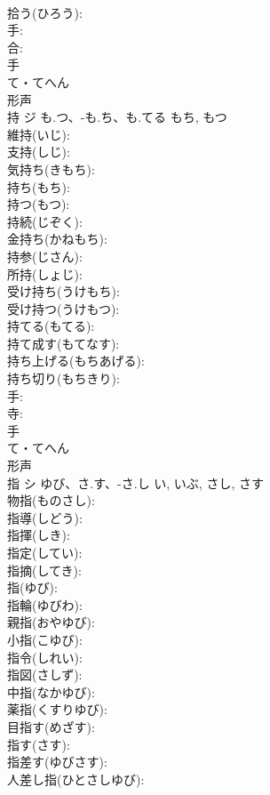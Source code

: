 \documentclass[8pt]{extreport}
\begin{document}
\begin{CJK}{UTF8}{min}
\\	拾う(ひろう): 
\\	手: 
\\	合: 
\\	手	
\\	て・てへん	
\\	形声 
\\	持	ジ	も.つ、-も.ち、も.てる	もち, もつ	
\\	維持(いじ): 
\\	支持(しじ): 
\\	気持ち(きもち): 
\\	持ち(もち): 
\\	持つ(もつ): 
\\	持続(じぞく): 
\\	金持ち(かねもち): 
\\	持参(じさん): 
\\	所持(しょじ): 
\\	受け持ち(うけもち): 
\\	受け持つ(うけもつ): 
\\	持てる(もてる): 
\\	持て成す(もてなす): 
\\	持ち上げる(もちあげる): 
\\	持ち切り(もちきり): 
\\	手: 
\\	寺: 
\\	手	
\\	て・てへん	
\\	形声 
\\	指	シ	ゆび、さ.す、-さ.し	い, いぶ, さし, さす	
\\	物指(ものさし): 
\\	指導(しどう): 
\\	指揮(しき): 
\\	指定(してい): 
\\	指摘(してき): 
\\	指(ゆび): 
\\	指輪(ゆびわ): 
\\	親指(おやゆび): 
\\	小指(こゆび): 
\\	指令(しれい): 
\\	指図(さしず): 
\\	中指(なかゆび): 
\\	薬指(くすりゆび): 
\\	目指す(めざす): 
\\	指す(さす): 
\\	指差す(ゆびさす): 
\\	人差し指(ひとさしゆび): 

\end{CJK}
\end{document}
